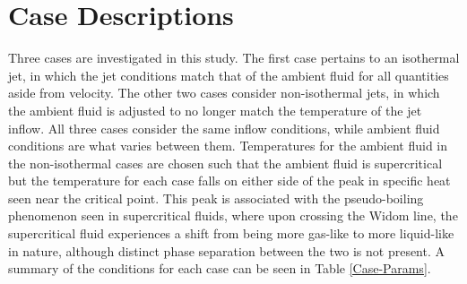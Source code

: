 \section{Case Descriptions}
Three cases are investigated in this study. The first case pertains to an isothermal jet, in which the jet conditions match that of the ambient fluid for all quantities aside from velocity. The other two cases consider non-isothermal jets, in which the ambient fluid is adjusted to no longer match the temperature of the jet inflow. All three cases consider the same inflow conditions, while ambient fluid conditions are what varies between them. Temperatures for the ambient fluid in the non-isothermal cases are chosen such that the ambient fluid is supercritical but the temperature for each case falls on either side of the peak in specific heat seen near the critical point. This peak is associated with the pseudo-boiling phenomenon seen in supercritical fluids, where upon crossing the Widom line, the supercritical fluid experiences a shift from being more gas-like to more liquid-like in nature, although distinct phase separation between the two is not present. A summary of the conditions for each case can be seen in Table \ref{Case-Params}.
